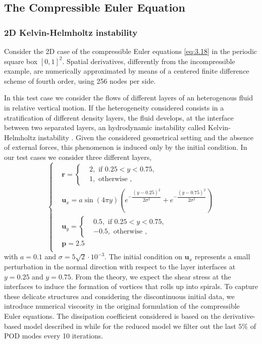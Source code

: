 \subsection{The Compressible Euler Equation}
\subsubsection{2D Kelvin-Helmholtz instability}
Consider the 2D case of the compressible Euler equations \eqref{eq:3.18} in the periodic square box $[0,1]^2$. Spatial derivatives, differently from the incompressible example, are numerically approximated by means of a centered finite difference scheme of fourth order, using 256 nodes per side. 

In this test case we consider the flows of different layers of an heterogenous fluid in relative vertical motion. If the heterogeneity considered consists in a stratification of different density layers, the fluid develops, at the interface between two separated layers, an hydrodynamic instability called Kelvin-Helmholtz instability \cite{HHS}. Given the considered geometrical setting and the absence of external forces, this phenomenon is induced only by the initial condition. In our test cases we consider three different layers, 
\begin{equation*}
\begin{cases}
& \mathbf{r} = 
\begin{cases}
& 2, \text{ if } 0.25<y<0.75,\\
& 1, \text{ otherwise },
\end{cases}
\\
& \mathbf{u}_x = a \sin(4\pi y) \left( e^{-\dfrac{(y-0.25)^2}{2\sigma^2}} + e^{-\dfrac{(y-0.75)^2}{2\sigma^2}} \right)\\
& \mathbf{u}_y = 
\begin{cases}
& 0.5, \text{ if } 0.25<y<0.75,\\
& -0.5, \text{ otherwise },
\end{cases}
\\
& \mathbf{p} = 2.5\\
\end{cases}
\end{equation*}
with $a=0.1$ and $\sigma=5\sqrt{2}\cdot 10^{-3}$.  The initial condition on $\mathbf{u}_x$ represents a small perturbation in the normal direction with respect to the layer interfaces at $y=0.25$ and $y=0.75$. From the theory, we expect the shear stress at the interfaces to induce the formation of vortices that rolls up into spirals. To capture these delicate structures and considering the discontinuous initial data, we introduce numerical viscosity in the original formulation of the compressible Euler equations. The dissipation coefficient considered is based on the derivative-based model described in \cite{artificial_dissipation} while for the reduced model we filter out the last $5\%$ of POD modes every 10 iterations.

